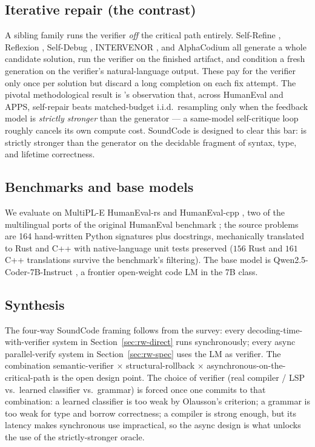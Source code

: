\subsection{Iterative repair (the contrast)}\label{sec:rw-repair}

A sibling family runs the verifier \emph{off} the critical path
entirely. Self-Refine \citep{madaan2023selfrefine},
Reflexion \citep{shinn2023reflexion}, Self-Debug
\citep{chen2024selfdebug}, INTERVENOR \citep{wang2024intervenor}, and
AlphaCodium \citep{ridnik2024alphacodium} all generate a whole
candidate solution, run the verifier on the finished artifact, and
condition a fresh generation on the verifier's natural-language
output. These pay for the verifier only once per solution but
discard a long completion on each fix attempt. The pivotal
methodological result is \citet{olausson2024selfrepair}'s observation
that, across HumanEval and APPS, self-repair beats matched-budget
i.i.d.\ resampling only when the feedback model is \emph{strictly
stronger} than the generator --- a same-model self-critique loop
roughly cancels its own compute cost.
SoundCode is designed to clear this bar:  is
strictly stronger than the generator on the decidable fragment of
syntax, type, and lifetime correctness.

\subsection{Benchmarks and base models}\label{sec:rw-bench}

We evaluate on MultiPL-E HumanEval-rs and HumanEval-cpp
\citep{cassano2022multipl}, two of the multilingual ports of the
original HumanEval benchmark \citep{chen2021humaneval}; the source
problems are 164 hand-written Python signatures plus docstrings,
mechanically translated to Rust and C++ with native-language unit
tests preserved ($156$ Rust and $161$ C++ translations survive the
benchmark's filtering). The base model is Qwen2.5-Coder-7B-Instruct
\citep{hui2024qwen25coder}, a frontier open-weight code LM in the
7B class.

\subsection{Synthesis}\label{sec:rw-synth}

The four-way SoundCode framing follows from the survey: every
decoding-time-with-verifier system in
Section~\ref{sec:rw-direct} runs synchronously; every async
parallel-verify system in Section~\ref{sec:rw-spec} uses the LM as
verifier. The combination semantic-verifier $\times$
structural-rollback $\times$ asynchronous-on-the-critical-path is the
open design point. The choice of verifier (real compiler / LSP vs.\
learned classifier vs.\ grammar) is forced once one commits to that
combination: a learned classifier is too weak by Olausson's
criterion; a grammar is too weak for type and borrow correctness; a
compiler is strong enough, but its latency makes synchronous use
impractical, so the async design is what unlocks the use of the
strictly-stronger oracle.
